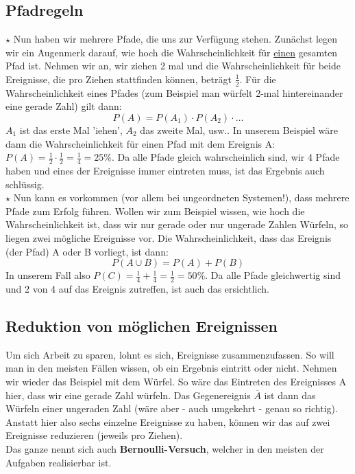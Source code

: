 \subsection{Pfadregeln}
\(\star\) Nun haben wir mehrere Pfade, die uns zur Verfügung stehen. Zunächst legen wir ein Augenmerk darauf, wie hoch die Wahrscheinlichkeit für \underline{einen} gesamten Pfad ist. Nehmen wir an, wir ziehen 2 mal und die Wahrscheinlichkeit für beide Ereignisse, die pro Ziehen stattfinden können, beträgt \(\frac{1}{2}\). Für die Wahrscheinlichkeit eines Pfades (zum Beispiel man würfelt 2-mal hintereinander eine gerade Zahl) gilt dann:
\[P(A)=P(A_1) \cdot P(A_2) \cdot \ldots\]
\(A_1\) ist das erste Mal 'iehen', \(A_2\) das zweite Mal, usw.. In unserem Beispiel wäre dann die Wahrscheinlichkeit für einen Pfad mit dem Ereignis A: \(P(A)=\frac{1}{2} \cdot \frac{1}{2}=\frac{1}{4}=25\%\). Da alle Pfade gleich wahrscheinlich sind, wir 4 Pfade haben und eines der Ereignisse immer eintreten muss, ist das Ergebnis auch schlüssig.\\
\(\star\) Nun kann es vorkommen (vor allem bei ungeordneten Systemen!), dass mehrere Pfade zum Erfolg führen. Wollen wir zum Beispiel wissen, wie hoch die Wahrscheinlichkeit ist, dass wir nur gerade oder nur ungerade Zahlen Würfeln, so liegen zwei mögliche Ereignisse vor. Die Wahrscheinlichkeit, dass das Ereignis (der Pfad) A oder B vorliegt, ist dann:
\[P(A\cup B)=P(A)+P(B)\]
In unserem Fall also \(P(C)=\frac{1}{4}+\frac{1}{4}=\frac{1}{2}=50\%\). Da alle Pfade gleichwertig sind und 2 von 4 auf das Ereignis zutreffen, ist auch das ersichtlich.

\subsection{Reduktion von möglichen Ereignissen}
Um sich Arbeit zu sparen, lohnt es sich, Ereignisse zusammenzufassen. So will man in den meisten Fällen wissen, ob ein Ergebnis eintritt oder nicht. 
Nehmen wir wieder das Beispiel mit dem Würfel. So wäre das Eintreten des Ereignisses A hier, dass wir eine gerade Zahl würfeln. Das Gegenereignis \(\overline{A}\) ist dann das Würfeln einer ungeraden Zahl (wäre aber - auch umgekehrt - genau so richtig). Anstatt hier also sechs einzelne Ereignisse zu haben, können wir das auf zwei Ereignisse reduzieren (jeweils pro Ziehen).\\
Das ganze nennt sich auch \textbf{Bernoulli-Versuch}, welcher in den meisten der Aufgaben realisierbar ist.
